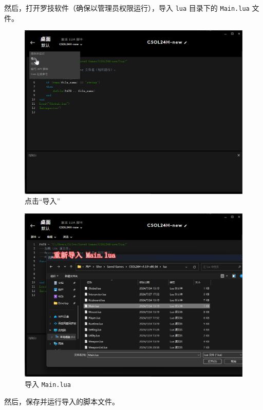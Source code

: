 然后，打开罗技软件（确保以管理员权限运行），导入 \lstinline{lua} 目录下的 \lstinline{Main.lua} 文件。

\begin{figure}[H]
    \Centering
    \includegraphics[width=\textwidth]{docs/assets/update/import_main_00.png}
    \caption{点击“导入”}
\end{figure}

\begin{figure}[H]
    \Centering
    \includegraphics[width=\textwidth]{docs/assets/update/import_main_01.png}
    \caption{导入 \lstinline{Main.lua}}
\end{figure}

然后，保存并运行导入的脚本文件。

